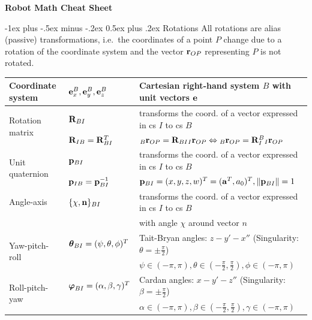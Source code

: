 \documentclass[10pt,landscape,a4paper]{article}
\makeatletter
\renewcommand{\section}{\@startsection{section}{1}{0mm}%
                                {-1ex plus -.5ex minus -.2ex}%
                                {0.5ex plus .2ex}%
                                {\normalfont\large\bfseries}}
\makeatother
\begin{document}
\raggedright
\footnotesize
\begin{multicols}{2}


\setlength{\premulticols}{1pt}
\setlength{\postmulticols}{1pt}
\setlength{\multicolsep}{1pt}
\setlength{\columnsep}{2pt}

\begin{center}
     \Large{\textbf{Robot Math Cheat Sheet}} \\
\end{center}
\section{Rotations}
All rotations are alias (passive) transformations, i.e.\ the coordinates of a point $P$ change due to a rotation of the coordinate system and the vector $\mathbf r_{OP}$ representing $P$ is not rotated.
\begin{tabular}{|l|l|l|}
\hline
Coordinate system & ${\mathbf e_x^B,\mathbf e_y^B,\mathbf e_z^B }$ & Cartesian right-hand system $B$ with unit vectors $\mathbf e$  \\ \hline
\multirow{2}{*}{Rotation matrix} & $\mathbf R_{BI}$ & transforms the coord. of a vector expressed in cs $I$ to cs $B$ \\ 
& $\mathbf R_{IB} = \mathbf R_{BI}^T$ & ${}_{B}\mathbf r_{OP} = \mathbf R_{BI} {}_{I}\mathbf r_{OP} \Leftrightarrow  {}_{B}\mathbf r_{OP} = \mathbf R_{I}^{B} {}_{I}\mathbf r_{OP}$ \\ \hline
\multirow{2}{*}{Unit quaternion} & $\mathbf p_{BI}$ &  transforms the coord. of a vector expressed in cs $I$ to cs $B$ \\
 & $\mathbf p_{IB} = \mathbf p_{BI}^{-1}$ & $\mathbf p_{BI}=(x,y,z,w)^T=(\mathbf a^T, a_0)^T, \left\lVert\mathbf p_{BI}\right\rVert=1$\\ \hline
Angle-axis & $\{\chi, \mathbf n\}_{BI}$ & transforms the coord. of a vector expressed in cs $I$ to cs $B$  \\
& & with angle $\chi$ around vector $n$ \\ \hline
\multirow{2}{*}{Yaw-pitch-roll} &  $\mbox{\boldmath $\theta$}_{BI}=(\psi, \theta, \phi)^T$  & Tait-Bryan angles: $z-y'-x''$ (Singularity: $\theta=\pm\frac{\pi}{2}$) \\
 & & $\psi\in(-\pi,\pi), \theta\in(-\frac{\pi}{2},\frac{\pi}{2}), \phi\in(-\pi,\pi)$  \\  \hline
\multirow{2}{*}{Roll-pitch-yaw} &  $\mbox{\boldmath $\varphi$}_{BI}=(\alpha, \beta, \gamma)^T$ & Cardan angles: $x-y'-z''$ (Singularity: $\beta=\pm\frac{\pi}{2}$)  \\
 & & $\alpha\in(-\pi,\pi), \beta\in(-\frac{\pi}{2},\frac{\pi}{2}), \gamma\in(-\pi,\pi)$  \\  \hline
\end{tabular}


\end{multicols}
\end{document}
